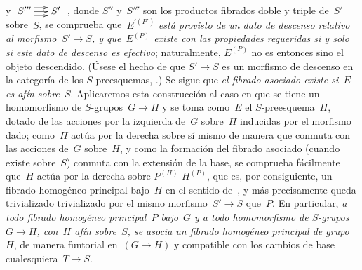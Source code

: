 y
$\xymatrix@C=.5cm{S'''\ar@<4pt>[r]\ar@<0pt>[r]\ar@<-4pt>[r]&S'}$%
\endgroup, donde
$S''$ y~$S'''$ son los productos fibrados doble y triple de~$S'$ sobre~$S$,
se comprueba que~$E^{\prime(P')}$ \emph{está provisto de un dato de descenso
relativo al morfismo~$S'\to S$, y que~$E^{(P)}$ existe con las propiedades
requeridas si y solo si este dato de descenso es efectivo}; naturalmente,
$E^{(P)}$ no es entonces sino el objeto descendido. (Úsese el hecho de que
$S'\to S$ es un morfismo de descenso en la categoría de los
$S$-preesquemas, \cf {}.) Se sigue que \emph{el fibrado asociado
existe si~$E$ es afín sobre~$S$}. Aplicaremos esta construcción al caso en
que se tiene un homomorfismo de $S$-grupos~$G\to H$ y se toma como~$E$ el
$S$-preesquema~$H$, dotado de las acciones por la izquierda de~$G$ sobre~$H$
inducidas por el morfismo dado; como~$H$ actúa por la derecha sobre sí mismo
de manera que conmuta con las acciones de~$G$ sobre~$H$, y como la formación
del fibrado asociado (cuando existe sobre~$S$) conmuta con la extensión de la
base, se comprueba fácilmente que~$H$ actúa por la derecha sobre
{$P^{(H)}$}
{$H^{(P)}$},
que es, por consiguiente, un fibrado homogéneo principal bajo~$H$ en el
sentido de~, y
más precisamente queda
{trivializado}
{trivializado}
por el mismo morfismo~$S'\to S$ que~$P$. En particular, \emph{a todo fibrado
homogéneo principal~$P$ bajo~$G$ y a todo homomorfismo de $S$-grupos
$G\to H$, con~$H$ afín sobre~$S$, se asocia un fibrado homogéneo principal de
grupo~$H$}, de manera funtorial en~$(G\to H)$ y compatible con los cambios
de base cualesquiera~$T\to S$.

